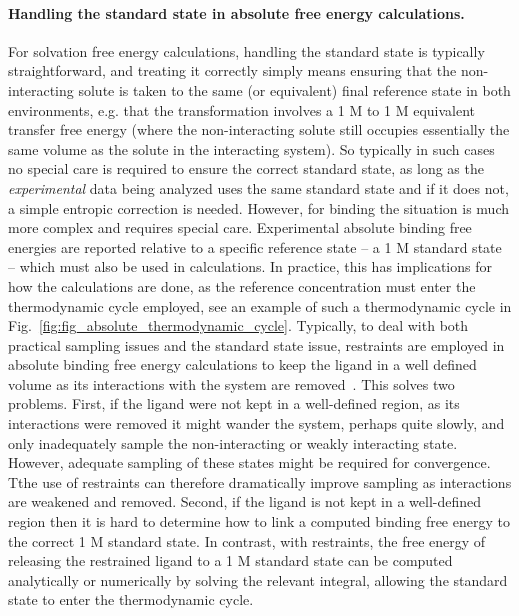 \documentclass[9pt,bestpractices]{livecoms}
\begin{document}
\paragraph{Handling the standard state in absolute free energy calculations.}
For solvation free energy calculations, handling the standard state is typically straightforward, and treating it correctly simply means ensuring that the non-interacting solute is taken to the same (or equivalent) final reference state in both environments, e.g. that the transformation involves a 1 M to 1 M equivalent transfer free energy (where the non-interacting solute still occupies essentially the same volume as the solute in the interacting system).
So typically in such cases no special care is required to ensure the correct standard state, as long as the \emph{experimental} data being analyzed uses the same standard state and if it does not, a simple entropic correction is needed.
%
However, for binding the situation is much more complex and requires special care.
Experimental absolute binding free energies are reported relative to a specific reference state -- a 1 M standard state -- which must also be used in calculations.
In practice, this has implications for how the calculations are done, as the reference concentration must enter the thermodynamic cycle employed, see an example of such a thermodynamic cycle in Fig.~\ref{fig:fig_absolute_thermodynamic_cycle}.
%
Typically, to deal with both practical sampling issues and the standard state issue, restraints are employed in absolute binding free energy calculations to keep the ligand in a well defined volume as its interactions with the system are removed~\cite{gilson1997statisticalthermodynamic}.
This solves two problems.
First, if the ligand were not kept in a well-defined region, as its interactions were removed it might wander the system, perhaps quite slowly, and only inadequately sample the non-interacting or weakly interacting state.  However, adequate sampling of these states might be required for convergence.
Tthe use of restraints can therefore dramatically improve sampling as interactions are weakened and removed.
Second, if the ligand is not kept in a well-defined region then it is hard to determine how to link a computed binding free energy to the correct 1 M standard state.
In contrast, with restraints, the free energy of releasing the restrained ligand to a 1 M standard state can be computed analytically or numerically by solving the relevant integral, allowing the standard state to enter the thermodynamic cycle.
%
\end{document}
